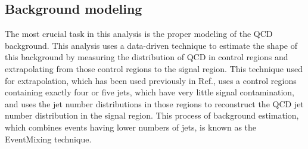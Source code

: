 



\subsection{Background modeling}
\label{sec:bkg}
\noindent

The most crucial task in this analysis is the proper modeling of the QCD background.
This analysis uses a data-driven technique to estimate the shape of this background by measuring the distribution of QCD in control regions
and extrapolating from those control regions to the signal region.
This technique used for extrapolation, which has been used previously in Ref.\cite{PhysRevD.82.032002},
uses a control regions containing exactly four or five jets, which have very little signal contamination,
and uses the jet number distributions in those regions to reconstruct the QCD jet number distribution
in the signal region.
This process of background estimation, which combines events having lower numbers of jets, is known as the EventMixing technique.

